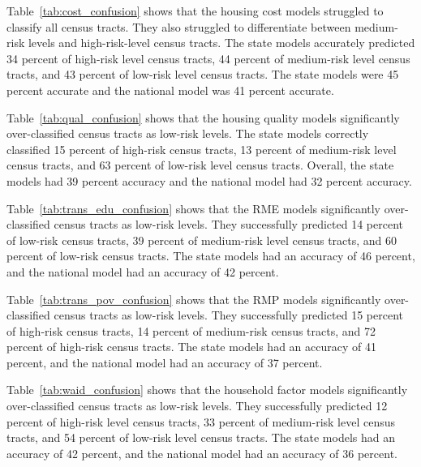  


Table~\ref{tab:cost_confusion} shows that the housing cost models struggled to classify all census tracts. They also struggled to differentiate between medium-risk levels and high-risk-level census tracts. The state models accurately predicted 34 percent of high-risk level census tracts, 44 percent of medium-risk level census tracts, and 43 percent of low-risk level census tracts. The state models were 45 percent accurate and the national model was 41 percent accurate. 

 

Table~\ref{tab:qual_confusion} shows that the housing quality models significantly over-classified census tracts as low-risk levels. The state models correctly classified 15 percent of high-risk census tracts, 13 percent of medium-risk level census tracts, and 63 percent of low-risk level census tracts. Overall, the state models had 39 percent accuracy and the national model had 32 percent accuracy. 

 

Table~\ref{tab:trans_edu_confusion} shows that the  RME models significantly over-classified census tracts as low-risk levels. They successfully predicted 14 percent of low-risk census tracts, 39 percent of medium-risk level census tracts, and  60 percent of low-risk census tracts. The state models had an accuracy of 46 percent, and the national model had an accuracy of 42 percent.

 

Table~\ref{tab:trans_pov_confusion} shows that the RMP models significantly over-classified census tracts as low-risk levels. They successfully predicted 15 percent of high-risk census tracts, 14 percent of medium-risk census tracts, and 72 percent of high-risk census tracts. The state models had an accuracy of 41 percent, and the national model had an accuracy of 37 percent. 

 


Table~\ref{tab:waid_confusion} shows that the household factor models significantly over-classified census tracts as low-risk levels. They successfully predicted 12 percent of high-risk level census tracts, 33 percent of medium-risk level census tracts, and 54 percent of low-risk level census tracts. The state models had an accuracy of 42 percent, and the national model had an accuracy of 36 percent. 

